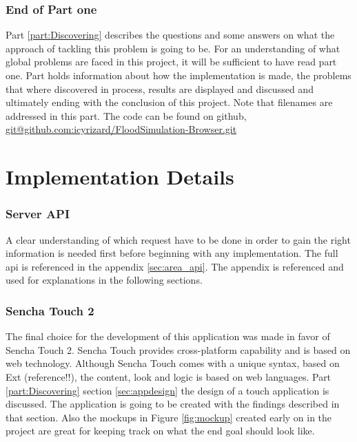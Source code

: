 
\section*{End of Part one}
Part \ref{part:Discovering} describes the questions and some answers on what the approach of tackling this problem is going to be. For an understanding of what global problems are faced in this project, it will be sufficient to have read part one. Part \ref{part:implementation} holds information about how the implementation is made, the problems that where discovered in process, results are displayed and discussed and ultimately ending with the conclusion of this project. Note that filenames are addressed in this part. The code can be found on github, \url{git@github.com:icyrizard/FloodSimulation-Browser.git}

\part{Implementation Details}
\label{part:implementation}
\section{Server API}
A clear understanding of which request have to be done in order to gain the right information is needed first before beginning with any implementation. The full api is referenced in the appendix \ref{sec:area_api}. The appendix is referenced and used for explanations in the following sections.

\section{Sencha Touch 2}
The final choice for the development of this application was made in favor of Sencha Touch 2.  Sencha Touch provides cross-platform capability and is based on web technology. Although Sencha Touch comes with a unique syntax, based on Ext (reference!!), the content, look and logic is based on web languages.
Part \ref{part:Discovering} section \ref{sec:appdesign} the design of a touch application is discussed. The application is going to be created with the findings described in that section. Also the mockups in Figure \ref{fig:mockup} created early on in the project are great for keeping track on what the end goal should look like. 

